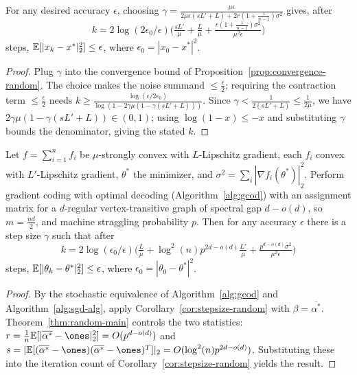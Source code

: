 \begin{corollary}
  \label{cor:stepsize-random}
  For any desired accuracy $\epsilon$, choosing
  $\gamma = \tfrac{\mu\epsilon}{2\mu\epsilon(sL'+L) + 2r(1+\frac1{n-1})\sigma^2}$
  gives, after
  \[
    k = 2\log(2\epsilon_0/\epsilon)\Big(\tfrac{sL'}{\mu} + \tfrac{L}{\mu}
      + \tfrac{r(1+\frac1{n-1})\sigma^2}{\mu^2\epsilon}\Big)
  \]
  steps, $\mathbb{E}[|x_k - x^*|_2^2] \le \epsilon$, where $\epsilon_0 = |x_0 - x^*|^2$.
\end{corollary}
\begin{proof}
  Plug $\gamma$ into the convergence bound of
  Proposition~\ref{prop:convergence-random}. The choice makes the noise summand
  $\le \tfrac\epsilon2$; requiring the contraction term $\le \tfrac\epsilon2$
  needs $k \ge \tfrac{\log(\epsilon/2\epsilon_0)}{\log(1 - 2\gamma\mu(1-\gamma(sL'+L)))}$.
  Since $\gamma < \tfrac1{2(sL'+L)} \le \tfrac1{2\mu}$, we have
  $2\gamma\mu(1-\gamma(sL'+L)) \in (0,1)$; using $\log(1-x) \le -x$ and
  substituting $\gamma$ bounds the denominator, giving the stated $k$.
\end{proof}

\begin{proposition}
  \label{prop:convergence-graph}
  Let $f = \sum_{i=1}^n f_i$ be $\mu$-strongly convex with $L$-Lipschitz
  gradient, each $f_i$ convex with $L'$-Lipschitz gradient, $\theta^*$ the
  minimizer, and $\sigma^2 = \sum_i|\nabla f_i(\theta^*)|_2^2$. Perform gradient
  coding with optimal decoding (Algorithm~\ref{alg:gcod}) with an assignment
  matrix for a $d$-regular vertex-transitive graph of spectral gap $d - o(d)$, so
  $m = \tfrac{nd}{2}$, and machine straggling probability $p$. Then for any
  accuracy $\epsilon$ there is a step size $\gamma$ such that after
  \[
    k = 2\log(\epsilon_0/\epsilon)\Big(\tfrac{L}{\mu}
      + \log^2(n)p^{2d - o(d)}\tfrac{L'}{\mu}
      + \tfrac{p^{d-o(d)}\sigma^2}{\mu^2\epsilon}\Big)
  \]
  steps, $\mathbb{E}[|\theta_k - \theta^*|_2^2] \le \epsilon$, where
  $\epsilon_0 = |\theta_0 - \theta^*|^2$.
\end{proposition}
\begin{proof}
  By the stochastic equivalence of Algorithm~\ref{alg:gcod} and
  Algorithm~\ref{alg:sgd-alg}, apply Corollary~\ref{cor:stepsize-random} with
  $\beta = \overline{\alpha^*}$. Theorem~\ref{thm:random-main} controls the two
  statistics: $r = \tfrac1n\E[|\overline{\alpha^*} - \ones|_2^2] = O(p^{d-o(d)})$
  and $s = |\E[(\overline{\alpha^*} - \ones)(\overline{\alpha^*}-\ones)^T]|_2
  = O(\log^2(n)p^{2d-o(d)})$. Substituting these into the iteration count of
  Corollary~\ref{cor:stepsize-random} yields the result.
\end{proof}

